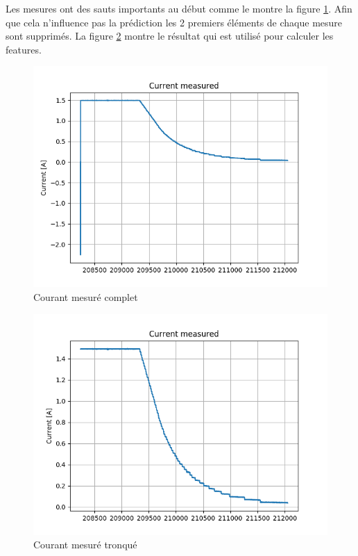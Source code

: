 Les mesures ont des sauts importants au début comme le montre la figure \ref{fig:courFull}. Afin que cela n'influence pas la prédiction les 2 premiers éléments de chaque mesure sont supprimés. La figure \ref{fig:courTron} montre le résultat qui est utilisé pour calculer les features.
\begin{figure}
    \centering
    \includegraphics[scale=0.5]{images/currentmeas.png}
    \caption{Courant mesuré complet}
    \label{fig:courFull}
\end{figure}

\begin{figure}
    \centering
    \includegraphics[scale=0.5]{images/currentmeasfilt.png}
    \caption{Courant mesuré tronqué}
    \label{fig:courTron}
\end{figure}


